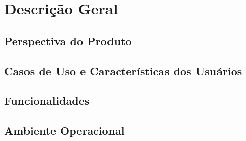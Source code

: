 \chapter{Descrição Geral}

\section{Perspectiva do Produto}

\section{Casos de Uso e Características dos Usuários}

\section{Funcionalidades}

\section{Ambiente Operacional}
